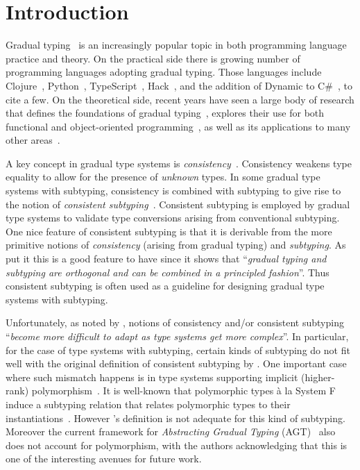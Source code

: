 \section{Introduction}
\label{sec:introduction}

Gradual typing~\cite{siek2006gradual} is an increasingly popular topic in both
programming language practice and theory. On the practical side there is growing
number of programming languages adopting gradual typing. Those languages include
Clojure~\cite{Bonnaire_Sergeant_2016}, Python~\cite{Vitousek_2014},
TypeScript~\cite{typescript}, Hack~\cite{verlaguet2013facebook}, and the
addition of Dynamic to C\#~\cite{Bierman_2010}, to cite a few. On the
theoretical side, recent years have seen a large body of research that defines
the foundations of gradual typing~\cite{garcia2016abstracting,
  cimini2016gradualizer, CiminiPOPL}, explores their use for both functional and
object-oriented programming~\cite{siek2006gradual, siek2007gradual}, as well as its applications
to many other areas~\cite{siek2016key, Ba_ados_Schwerter_2014}.

A key concept in gradual type systems is
\emph{consistency}~\cite{siek2006gradual}. Consistency weakens type equality to allow
for the presence of \emph{unknown} types. In some gradual type systems
with subtyping, consistency is combined with subtyping to give rise to
the notion of \emph{consistent subtyping}~\cite{siek2007gradual}. Consistent
subtyping is employed by gradual type systems to validate type
conversions arising from conventional subtyping. One nice feature of consistent
subtyping is that it is derivable from the more primitive
notions of \emph{consistency} (arising from gradual typing) and
\emph{subtyping}. As \citet{siek2007gradual}
put it this is a good feature to have since it shows that
``\emph{gradual typing and subtyping are orthogonal and can be combined in a principled fashion}''.
Thus consistent subtyping is often used as a guideline for
designing gradual type systems with subtyping. 

Unfortunately, as noted by \citet{garcia2016abstracting}, notions of
consistency and/or consistent subtyping ``\emph{become more difficult to adapt
  as type systems get more complex}''. In particular, for the case of type
systems with subtyping, certain kinds of subtyping do not fit well with the
original definition of consistent subtyping by \citet{siek2007gradual}. One
important case where such mismatch happens is in type systems supporting
implicit (higher-rank) polymorphism~\cite{jones2007practical,dunfield2013complete}. 
It is well-known that polymorphic types
\`a la System F induce a subtyping relation that relates polymorphic types to
their instantiations~\cite{odersky1996putting, mitchell1990polymorphic}. However
\citeauthor{siek2007gradual}'s definition is not adequate for this kind of
subtyping. Moreover the current framework for \emph{Abstracting Gradual
Typing} (AGT)~\cite{garcia2016abstracting} also does not account for polymorphism, with the authors
acknowledging that this is one of the interesting avenues for future work. 

